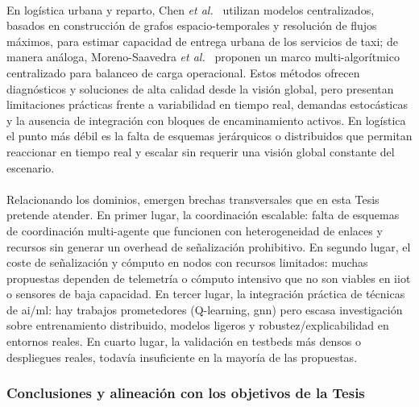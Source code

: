 \\
En logística urbana y reparto, Chen \textit{et al.}~\cite{Chen21taxi} utilizan modelos centralizados, basados en construcción de grafos espacio-temporales y resolución de flujos máximos, para estimar capacidad de entrega urbana de los servicios de taxi; de manera análoga, Moreno-Saavedra \textit{et al.}~\cite{moreno2024multi} proponen un marco multi-algorítmico centralizado para balanceo de carga operacional. Estos métodos ofrecen diagnósticos y soluciones de alta calidad desde la visión global, pero presentan limitaciones prácticas frente a variabilidad en tiempo real, demandas estocásticas y la ausencia de integración con bloques de encaminamiento activos. En logística el punto más débil es la falta de esquemas jerárquicos o distribuidos que permitan reaccionar en tiempo real y escalar sin requerir una visión global constante del escenario.\\
\\
Relacionando los dominios, emergen brechas transversales que en esta Tesis pretende atender. En primer lugar, la coordinación escalable: falta de esquemas de coordinación multi-agente que funcionen con heterogeneidad de enlaces y recursos sin generar un overhead de señalización prohibitivo. En segundo lugar, el coste de señalización y cómputo en nodos con recursos limitados: muchas propuestas dependen de telemetría o cómputo intensivo que no son viables en \gls{iiot} o sensores de baja capacidad. En tercer lugar, la integración práctica de técnicas de \gls{ai}/\gls{ml}: hay trabajos prometedores (Q-learning, \gls{gnn}) pero escasa investigación sobre entrenamiento distribuido, modelos ligeros y robustez/explicabilidad en entornos reales. En cuarto lugar, la validación en testbeds más densos o despliegues reales, todavía insuficiente en la mayoría de las propuestas.

\subsubsection{Conclusiones y alineación con los objetivos de la Tesis}

